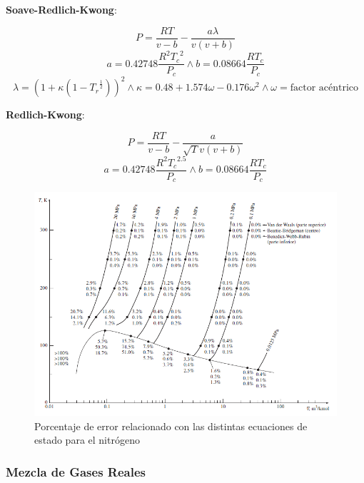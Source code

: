             \textbf{Soave-Redlich-Kwong}:
        
            \begin{equation}
                P=\frac{RT}{v-b} - \frac{a \lambda}{v(v+b)}
            \end{equation}
            \[a=0.42748\frac{R^{2}{T_{c}}^{2}}{P_{c}} \wedge b=0.08664\frac{RT_{c}}{P_{c}}\]
            \[\lambda=\left ( 1 + \kappa \left ( 1-{T_{r}}^{\frac{1}{2}} \right ) \right )^{2} \wedge \kappa=0.48+1.574\omega - 0.176 \omega^{2} \wedge \omega = \text{factor acéntrico}\]
            
            \textbf{Redlich-Kwong}:
        
            \begin{equation}
                P=\frac{RT}{v-b} - \frac{a}{\sqrt{T}v(v+b)}
            \end{equation}
            \[a=0.42748\frac{R^{2}{T_{c}}^{2.5}}{P_{c}} \wedge b=0.08664\frac{RT_{c}}{P_{c}}\]
            
            
            \begin{figure}
                \centering
                \includegraphics[width=.9\textwidth]{img/diagramas/error_estado.png}
                \caption[Porcentaje de error relacionado con las distintas ecuaciones de estado para el nitrógeno]{Porcentaje de error relacionado con las distintas ecuaciones de estado para el nitrógeno \cite{cengel_termodinamica_2012}}
                \label{fig:error_estado}
            \end{figure}
        
        \subsubsection{Mezcla de Gases Reales}
        
